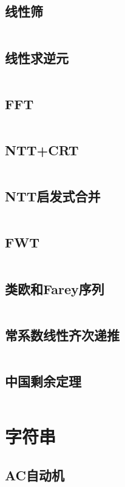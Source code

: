 \documentclass[UTF8]{ctexart}
\begin{document}
\subsection{线性筛}
\inputminted{cpp}{math/线性筛.cpp}

\subsection{线性求逆元}
\inputminted{cpp}{math/线性求逆元.cpp}

\subsection{FFT}
\inputminted{cpp}{math/FFT.cpp}

\subsection{NTT+CRT}
\inputminted{cpp}{math/NTT+CRT.cpp}

\subsection{NTT启发式合并}
\inputminted{cpp}{math/NTT启发式合并.cpp}

\subsection{FWT}
\inputminted{cpp}{math/FWT.cpp}

\subsection{类欧和Farey序列}
\inputminted{cpp}{math/类欧和Farey序列.cpp}

\subsection{常系数线性齐次递推}
\inputminted{cpp}{math/常系数线性齐次递推.cpp}

\subsection{中国剩余定理}
\inputminted{cpp}{math/中国剩余定理.cpp}

\section{字符串}

\subsection{AC自动机}
\inputminted{cpp}{string/AC自动机.cpp}
\end{document}
